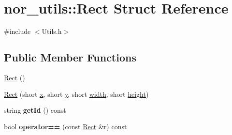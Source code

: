 \hypertarget{structnor__utils_1_1Rect}{
\section{nor\_\-utils::Rect Struct Reference}
\label{structnor__utils_1_1Rect}
}


{\ttfamily \#include $<$Utils.h$>$}

\subsection*{Public Member Functions}
\begin{DoxyCompactItemize}
\item 
\hyperlink{structnor__utils_1_1Rect_af39433453b9a0fbab46ab51270859ae6}{Rect} ()
\item 
\hyperlink{structnor__utils_1_1Rect_ae7b9c78ccc421d38a6cffc782c986f52}{Rect} (short \hyperlink{structnor__utils_1_1Rect_a2cc2c482bf4ca03735eb62d96c2826aa}{x}, short \hyperlink{structnor__utils_1_1Rect_ae9e3e50e31a863c3eb77ac5f60879698}{y}, short \hyperlink{structnor__utils_1_1Rect_aee09adb83e3a2b02f2663fde2cc727ee}{width}, short \hyperlink{structnor__utils_1_1Rect_a845bb58e84a3b2006ed0a98d7d3859a8}{height})
\item 
\hypertarget{structnor__utils_1_1Rect_afdd165ca06de310b1ccd09a0f330c1fe}{
string {\bfseries getId} () const }
\label{structnor__utils_1_1Rect_afdd165ca06de310b1ccd09a0f330c1fe}

\item 
\hypertarget{structnor__utils_1_1Rect_a33ba23ca16f13d9d9b4227673b5c2678}{
bool {\bfseries operator==} (const \hyperlink{structnor__utils_1_1Rect}{Rect} \&r) const }
\label{structnor__utils_1_1Rect_a33ba23ca16f13d9d9b4227673b5c2678}

\end{DoxyCompactItemize}
